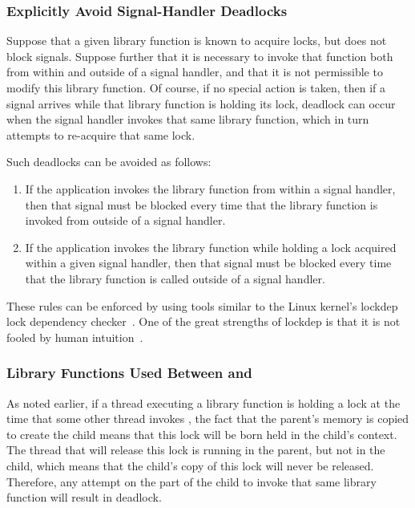 \subsubsection{Explicitly Avoid Signal-Handler Deadlocks}
\label{sec:locking:Explicitly Avoid Signal-Handler Deadlocks}

Suppose that a given library function is known to acquire locks,
but does not block signals.
Suppose further that it is necessary to invoke that function both from
within and outside of a signal handler, and that it is not permissible
to modify this library function.
Of course, if no special action is taken, then if a signal arrives
while that library function is holding its lock, deadlock can occur
when the signal handler invokes that same library function,
which in turn attempts to re-acquire that same lock.

Such deadlocks can be avoided as follows:

\begin{enumerate}
\item	If the application invokes the library function from
	within a signal handler, then that signal must be blocked
	every time that the library function is invoked from outside
	of a signal handler.
\item	If the application invokes the library function
	while holding a lock acquired within a given signal
	handler, then that signal must be blocked every time that the
	library function is called outside of a signal handler.
\end{enumerate}

These rules can be enforced by using tools similar to
the Linux kernel's lockdep lock dependency
checker~\cite{JonathanCorbet2006lockdep}.
One of the great strengths of lockdep is that it is not fooled by
human intuition~\cite{StevenRostedt2011locdepCryptic}.

\subsubsection{Library Functions Used Between  and }
\label{sec:locking:Library Functions Used Between fork() and exec()}

As noted earlier, if a thread executing a library function is holding
a lock at the time that some other thread invokes , the
fact that the parent's memory is copied to create the child means that
this lock will be born held in the child's context.
The thread that will release this lock is running in the parent, but not
in the child, which means that the child's copy of this lock will never
be released.
Therefore, any attempt on the part of the child to invoke that same
library function will result in deadlock.

